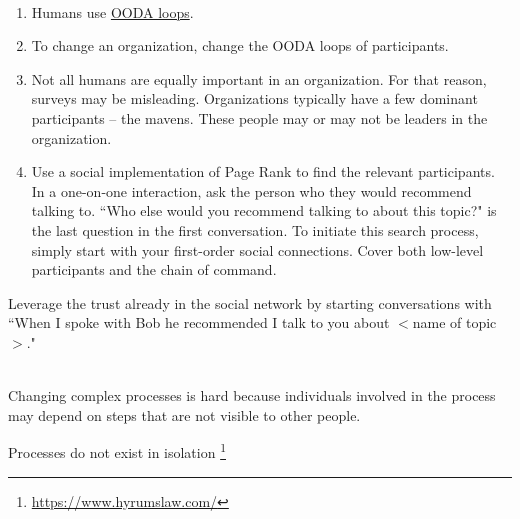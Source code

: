 \ \\

\begin{enumerate}
    \item Humans use \href{https://en.wikipedia.org/wiki/OODA_loop}{OODA loops}.
    \item To change an organization, change the OODA loops of participants.
    \item Not all humans are equally important in an organization. For that reason, surveys may be misleading. Organizations typically have a few dominant participants -- the mavens. These people may or may not be leaders in the organization.
    \item Use a social implementation of Page Rank to find the relevant participants. In a one-on-one interaction, ask the person who they would recommend talking to.
``Who else would you recommend talking to about this topic?" is the last question in the first conversation.
To initiate this search process, simply start with your first-order social connections. Cover both low-level participants and the chain of command.
\end{enumerate}

Leverage the trust already in the social network by starting conversations with ``When I spoke with Bob he recommended I talk to you about $<$name of topic$>$."





\ \\

Changing complex processes is hard because individuals involved in the process may depend on steps that are not visible to other people.


Processes do not exist in isolation
\footnote{\href{https://www.hyrumslaw.com/}{https://www.hyrumslaw.com/}} %
